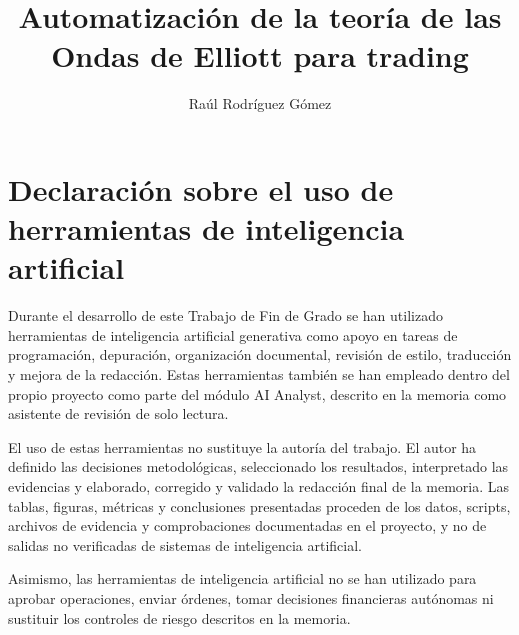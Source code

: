 \documentclass[twoside,spanish,a4paper,12pt]{tfg}
\title{Automatizaci\'on de la teor\'ia de las Ondas de Elliott para trading}
\author{Ra\'ul Rodr\'iguez G\'omez}
\makeatletter
\renewcommand{\cleardoublepage}{%
  \clearpage
  \if@twoside
    \ifodd\c@page
    \else
      \thispagestyle{empty}%
      \hbox{}%
      \newpage
      \if@twocolumn\hbox{}\newpage\fi
    \fi
  \fi
}
\makeatother
\begin{document}
\portada
\cleardoublepage
\contraportada
\cleardoublepage
\declaracion
\cleardoublepage

\chapter*{Declaraci\'on sobre el uso de herramientas de inteligencia artificial}
\pagestyle{empty}

Durante el desarrollo de este Trabajo de Fin de Grado se han utilizado
herramientas de inteligencia artificial generativa como apoyo en tareas
de programaci\'on, depuraci\'on, organizaci\'on documental, revisi\'on de estilo,
traducci\'on y mejora de la redacci\'on. Estas herramientas tambi\'en se han
empleado dentro del propio proyecto como parte del m\'odulo AI Analyst, descrito
en la memoria como asistente de revisi\'on de solo lectura.

El uso de estas herramientas no sustituye la autor\'ia del trabajo. El autor ha
definido las decisiones metodol\'ogicas, seleccionado los resultados, interpretado
las evidencias y elaborado, corregido y validado la redacci\'on final de la
memoria. Las tablas, figuras, m\'etricas y conclusiones presentadas proceden de
los datos, scripts, archivos de evidencia y comprobaciones documentadas en el
proyecto, y no de salidas no verificadas de sistemas de inteligencia artificial.

Asimismo, las herramientas de inteligencia artificial no se han utilizado para
aprobar operaciones, enviar \'ordenes, tomar decisiones financieras aut\'onomas ni
sustituir los controles de riesgo descritos en la memoria.

\cleardoublepage
\end{document}
